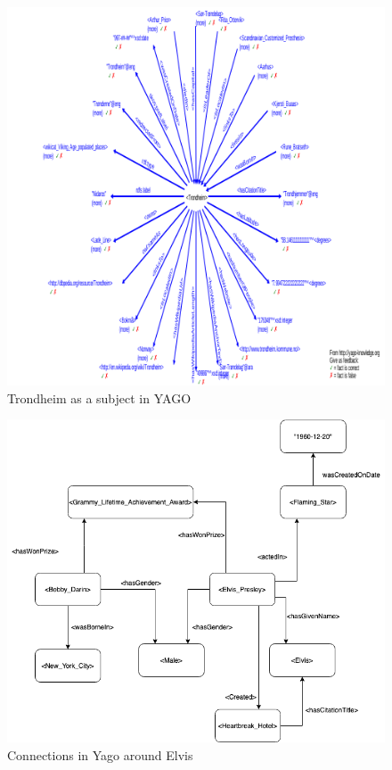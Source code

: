 \begin{figure}[t]
  \centering
  \includegraphics[scale=0.3]{figs/yago_trondheim.png}
 \caption{Trondheim as a subject in YAGO}
 \label{fig:Trondheim}
\end{figure}

\begin{figure}[t]
  \centering
  \includegraphics[scale=0.5]{figs/yagoExample.png}
 \caption{Connections in Yago around Elvis}
 \label{fig:Elvis}
\end{figure}

